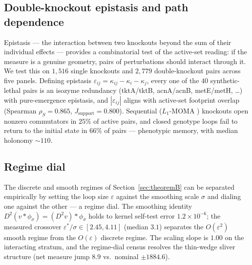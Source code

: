 \documentclass[11pt,a4paper]{article}
\theoremstyle{plain}
\theoremstyle{definition}
\theoremstyle{remark}
\begin{document}
\subsection{Double-knockout epistasis and path dependence}
Epistasis --- the interaction between two knockouts beyond the sum of
their individual effects --- provides a combinatorial test of the
active-set reading: if the measure is a genuine geometry, pairs of
perturbations should interact through it. We test this on $1{,}516$
single knockouts and $2{,}779$ double-knockout pairs across five
panels. Defining epistasis $\varepsilon_{ij} = \kappa_{ij} - \kappa_i -
\kappa_j$, every one of the $40$ synthetic-lethal pairs is an
isozyme redundancy (tktA/tktB, acnA/acnB, metE/metH, \dots) with
pure-emergence epistasis, and $|\varepsilon_{ij}|$ aligns with
active-set footprint overlap (Spearman $\rho_S = 0.865$,
$J_{\mathrm{support}} = 0.800$). Sequential ($L_1$-MOMA
\citep{segre2002}) knockouts open nonzero commutators in $25\%$ of
active pairs, and closed genotype loops fail to return to the initial
state in $66\%$ of pairs --- phenotypic memory, with median holonomy
$\sim 110$.

\subsection{Regime dial}
\label{sec:m4}
The discrete and smooth regimes of Section~\ref{sec:theoremB} can be
separated empirically by setting the loop size $\varepsilon$ against
the smoothing scale $\sigma$ and dialing one against the other --- a
regime dial. The smoothing identity $D^2(v * \phi_\sigma) = (D^2 v) * \phi_\sigma$
holds to kernel self-test error $1.2 \times 10^{-6}$; the measured
crossover $\varepsilon^*/\sigma \in [2.45, 4.11]$ (median $3.1$)
separates the $O(\varepsilon^2)$ smooth regime from the
$O(\varepsilon)$ discrete regime. The scaling slope is $1.00$ on the
interacting stratum, and the regime-dial census resolves the
thin-wedge sliver structure (net measure jump $8.9$ vs.\ nominal
$\pm 1884.6$).
\end{document}
